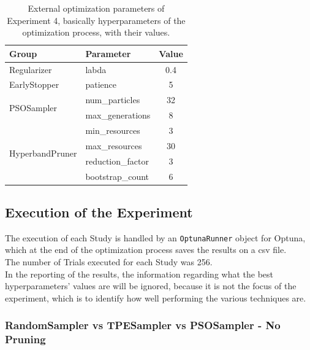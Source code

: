 \begin{table}[ht!]
	\center
	\setlength{\tabcolsep}{0.5cm}
	\caption[Optimization External Parameters of Experiment 4]{External optimization parameters of Experiment 4, basically hyperparameters of the optimization process, with their values.}
	\begin{tabular}{@{}llc@{}}
		\toprule
		\textbf{Group}                   & \textbf{Parameter} & \textbf{Value} \\ \midrule
		Regularizer                      & labda              & 0.4            \\[0.1cm]
		EarlyStopper                     & patience           & 5              \\[0.2cm]
		\multirow{2}{*}{PSOSampler}      & num\_particles     & 32             \\[0.1cm]
										 & max\_generations   & 8              \\[0.2cm]
		\multirow{4}{*}{HyperbandPruner} & min\_resources     & 3              \\[0.1cm]
										 & max\_resources     & 30             \\[0.1cm]
										 & reduction\_factor  & 3              \\[0.1cm]
										 & bootstrap\_count   & 6              \\ \bottomrule
	\end{tabular}
	\label{tab:table-4.4.2}
\end{table}

\subsection{Execution of the Experiment}

The execution of each Study is handled by an \texttt{OptunaRunner} object for Optuna, which at the end of the optimization process saves the results on a csv file.
\\[0.3cm]The number of Trials executed for each Study was 256.
\\[0.3cm]In the reporting of the results, the information regarding what the best hyperparameters' values are will be ignored, because it is not the focus of the experiment, which is to identify how well performing the various techniques are.

\subsubsection{RandomSampler  vs  TPESampler  vs  PSOSampler  -  No Pruning}


